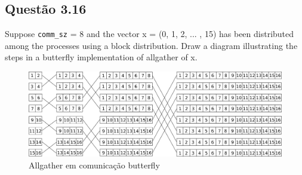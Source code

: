 

\subsection{Questão 3.16}

Suppose \texttt{comm\_sz} = 8 and the vector x = (0, 1, 2, ... , 15) has been distributed among the processes using a block distribution. Draw a diagram illustrating the steps in a butterfly implementation of allgather of x. \\


\begin{figure}[h!]
  \begin{center}
    \includegraphics[width=450pt]{sections/q3.16/imgs/g1.png}
  \end{center}
  \caption{Allgather em comunicação butterfly}
  \label{fig:scattertree}
\end{figure}



